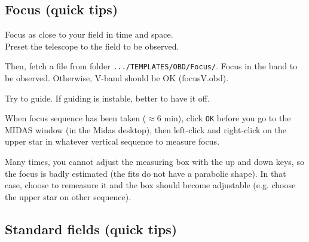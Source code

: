 \documentclass[11pt,fleqn]{book} %
\begin{document}
\subsection{Focus (quick tips)}

Focus as close to your field in time and space. \\
Preset the telescope to the field to be observed.

Then, fetch a file from folder \texttt{.../TEMPLATES/OBD/Focus/}. 
Focus in the band to be observed. Otherwise, V-band should be OK (focusV.obd).

Try to guide. If guiding is instable, better to have it off.

When focus sequence has been taken ($\approx 6$ min), click \texttt{OK}
before you go to the MIDAS window (in the Midas desktop), then left-click and right-click on the upper star in whatever vertical sequence to measure focus.  

Many times, you cannot adjust the measuring box with the up and down keys, so the focus is badly estimated (the fits do not have a parabolic shape).  In that case, choose to remeasure it and the box should become adjustable (e.g. choose the upper star on other sequence).




\subsection{Standard fields (quick tips)}
\end{document}
